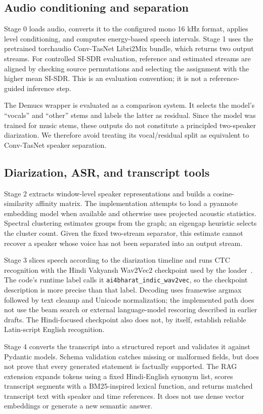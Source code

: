 \documentclass[11pt,a4paper,twocolumn]{article}
\begin{document}
\subsection{Audio conditioning and separation}
Stage 0 loads audio, converts it to the configured mono 16 kHz format, applies level conditioning, and computes energy-based speech intervals. Stage 1 uses the pretrained torchaudio Conv-TasNet Libri2Mix bundle, which returns two output streams. For controlled SI-SDR evaluation, reference and estimated streams are aligned by checking source permutations and selecting the assignment with the higher mean SI-SDR. This is an evaluation convention; it is not a reference-guided inference step.

The Demucs wrapper is evaluated as a comparison system. It selects the model's ``vocals'' and ``other'' stems and labels the latter as residual. Since the model was trained for music stems, these outputs do not constitute a principled two-speaker diarization. We therefore avoid treating its vocal/residual split as equivalent to Conv-TasNet speaker separation.

\subsection{Diarization, ASR, and transcript tools}
Stage 2 extracts window-level speaker representations and builds a cosine-similarity affinity matrix. The implementation attempts to load a pyannote embedding model when available and otherwise uses projected acoustic statistics. Spectral clustering estimates groups from the graph; an eigengap heuristic selects the cluster count. Given the fixed two-stream separator, this estimate cannot recover a speaker whose voice has not been separated into an output stream.

Stage 3 slices speech according to the diarization timeline and runs CTC recognition with the Hindi Vakyansh Wav2Vec2 checkpoint used by the loader~\cite{vakyansh}. The code's runtime label calls it \texttt{ai4bharat\_indic\_wav2vec}, so the checkpoint description is more precise than that label. Decoding uses framewise argmax followed by text cleanup and Unicode normalization; the implemented path does not use the beam search or external language-model rescoring described in earlier drafts. The Hindi-focused checkpoint also does not, by itself, establish reliable Latin-script English recognition.

Stage 4 converts the transcript into a structured report and validates it against Pydantic models. Schema validation catches missing or malformed fields, but does not prove that every generated statement is factually supported. The RAG extension expands tokens using a fixed Hindi-English synonym list, scores transcript segments with a BM25-inspired lexical function, and returns matched transcript text with speaker and time references. It does not use dense vector embeddings or generate a new semantic answer.
\end{document}
